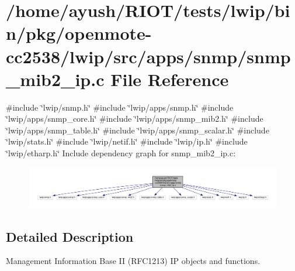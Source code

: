 \hypertarget{openmote-cc2538_2lwip_2src_2apps_2snmp_2snmp__mib2__ip_8c}{}\section{/home/ayush/\+R\+I\+O\+T/tests/lwip/bin/pkg/openmote-\/cc2538/lwip/src/apps/snmp/snmp\+\_\+mib2\+\_\+ip.c File Reference}
\label{openmote-cc2538_2lwip_2src_2apps_2snmp_2snmp__mib2__ip_8c}
{\ttfamily \#include \char`\"{}lwip/snmp.\+h\char`\"{}}\newline
{\ttfamily \#include \char`\"{}lwip/apps/snmp.\+h\char`\"{}}\newline
{\ttfamily \#include \char`\"{}lwip/apps/snmp\+\_\+core.\+h\char`\"{}}\newline
{\ttfamily \#include \char`\"{}lwip/apps/snmp\+\_\+mib2.\+h\char`\"{}}\newline
{\ttfamily \#include \char`\"{}lwip/apps/snmp\+\_\+table.\+h\char`\"{}}\newline
{\ttfamily \#include \char`\"{}lwip/apps/snmp\+\_\+scalar.\+h\char`\"{}}\newline
{\ttfamily \#include \char`\"{}lwip/stats.\+h\char`\"{}}\newline
{\ttfamily \#include \char`\"{}lwip/netif.\+h\char`\"{}}\newline
{\ttfamily \#include \char`\"{}lwip/ip.\+h\char`\"{}}\newline
{\ttfamily \#include \char`\"{}lwip/etharp.\+h\char`\"{}}\newline
Include dependency graph for snmp\+\_\+mib2\+\_\+ip.\+c\+:
\nopagebreak
\begin{figure}[H]
\begin{center}
\leavevmode
\includegraphics[width=350pt]{openmote-cc2538_2lwip_2src_2apps_2snmp_2snmp__mib2__ip_8c__incl}
\end{center}
\end{figure}


\subsection{Detailed Description}
Management Information Base II (R\+F\+C1213) IP objects and functions. 
